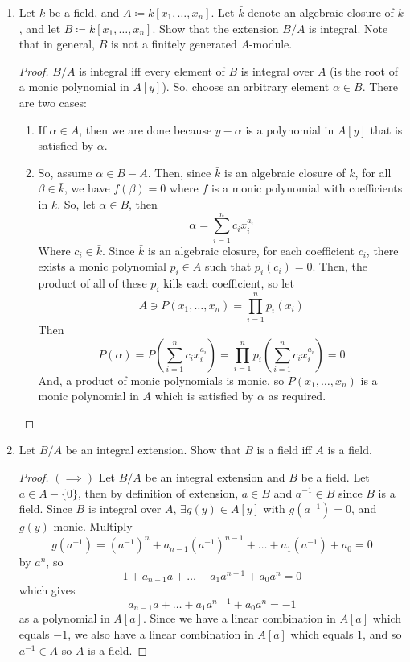 \documentclass[hidelinks,12pt]{article}
\begin{document}
\begin{enumerate}
\begin{enumerate}[label=(\alph*).]
\begin{proof}
                \end{proof}
        \end{enumerate}
    \item Let \(k\) be a field, and \(A\coloneqq k[x_{1},\dots,x_{n}]\). Let \(\bar{k}\) denote an algebraic closure of \(k\), and let \(B\coloneqq \bar{k}[x_{1},\dots,x_{n}]\). Show that the extension \(B/A\) is integral. Note that in general, \(B\) is not a finitely generated \(A\)-module.
        \begin{proof}
            \(B/A\) is integral iff every element of \(B\) is integral over \(A\) (is the root of a monic polynomial in \(A[y]\)). So, choose an arbitrary element \(\alpha\in B\). There are two cases:
            \begin{enumerate}
                \item If \(\alpha\in A\), then we are done because \(y-\alpha\) is a polynomial in \(A[y]\) that is satisfied by \(\alpha\).
                \item So, assume \(\alpha\in B-A\). Then, since \(\bar{k}\) is an algebraic closure of \(k\), for all \(\beta\in\bar{k}\), we have \(f(\beta)=0\) where \(f\) is a monic polynomial with coefficients in \(k\). So, let \(\alpha\in B\), then \[
                        \alpha=\sum_{i=1}^{n} c_{i}x_{i}^{a_{i}}
                    \]
                    Where \(c_{i}\in\bar{k}\). Since \(\bar{k}\) is an algebraic closure, for each coefficient \(c_{i}\), there exists a monic polynomial \(p_{i}\in A\) such that \(p_{i}(c_{i})=0\). Then, the product of all of these \(p_{i}\) kills each coefficient, so let \[
                        A\ni P(x_{1},\dots,x_{n})=\prod_{i=1}^{n}p_{i}(x_{i})
                    \]
                    Then
                    \[
                        P\left(\alpha\right)=P\left(\sum_{i=1}^{n}c_{i}x_{i}^{a_{i}}\right)=\prod_{i=1}^{n}p_{i}\left(\sum_{i=1}^{n}c_{i}x_{i}^{a_{i}}\right)=0
                    \]
                    And, a product of monic polynomials is monic, so \(P(x_{1},\dots,x_{n})\) is a monic polynomial in \(A\) which is satisfied by \(\alpha\) as required.
            \end{enumerate}
        \end{proof}
    \item Let \(B/A\) be an integral extension. Show that \(B\) is a field iff \(A\) is a field.
        \begin{proof}
            \((\implies)\) Let \(B/A\) be an integral extension and \(B\) be a field. Let \(a\in A-\{0\}\), then by definition of extension, \(a\in B\) and \(a^{-1}\in B\) since \(B\) is a field. Since \(B\) is integral over \(A\), \(\exists g(y)\in A[y]\) with \(g(a^{-1})=0\), and \(g(y)\) monic. Multiply \[g(a^{-1})=(a^{-1})^{n}+a_{n-1}(a^{-1})^{n-1}+\dots+a_{1}(a^{-1})+a_{0}=0\] by \(a^{n}\), so \[1+a_{n-1}a+\dots+a_{1}a^{n-1}+a_{0}a^{n}=0\] which gives \[a_{n-1}a+\dots+a_{1}a^{n-1}+a_{0}a^{n}=-1\] as a polynomial in \(A[a]\). Since we have a linear combination in \(A[a]\) which equals \(-1\), we also have a linear combination in \(A[a]\) which equals \(1\), and so \(a^{-1}\in A\) so \(A\) is a field.

\end{proof}
\end{enumerate}
\end{document}
